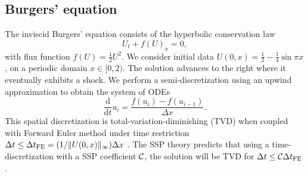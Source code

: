 \subsection{Burgers' equation}\label{subsubsec:burgers}

The inviscid Burgers' equation consists of the hyperbolic conservation law
\begin{equation}\label{eq:HCL}
    U_{t} + f(U)_{x} = 0,
\end{equation}
with flux function $f(U) = \frac{1}{2}U^{2}$. 
We consider initial data
$U(0,x)  = \frac{1}{2} - \frac{1}{4}\sin{\pi x}$,
on a periodic domain $x \in [0,2)$.
The solution advances to the right where it eventually exhibits a shock. 
We perform a semi-discretization
using an upwind approximation to obtain the system of ODEs
\begin{equation*}%
  \frac{\textrm{d}}{\textrm{d} t}
  u_i = \frac{f(u_{i}) - f(u_{i-1})}{\Delta x}.
\end{equation*}
This spatial discretization is total-variation-diminishing (TVD) when
coupled with Forward Euler method under time restriction
$\Delta t \leq {\Delta t}_{\text{FE}} = (1 / \|U(0,x)\|_{\infty}) \Delta x$
\cite{Laney:1998}.
The SSP theory predicts that using a time-discretization with a SSP
coefficient $\mathcal{C}$, the solution will be TVD for $\Delta t \leq
\mathcal{C} {\Delta t}_{\text{FE}}$.


